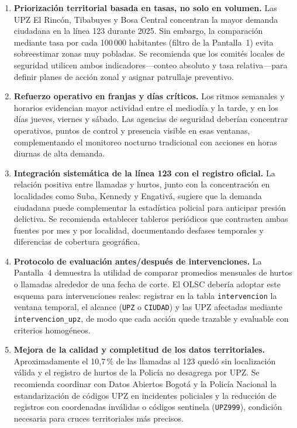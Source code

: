 \documentclass[12pt,letterpaper]{article}
\begin{document}
\begin{enumerate}
    \item \textbf{Priorización territorial basada en tasas, no solo en volumen.} Las UPZ El Rincón, Tibabuyes y Bosa Central concentran la mayor demanda ciudadana en la línea 123 durante 2025. Sin embargo, la comparación mediante tasa por cada 100\,000 habitantes (filtro de la Pantalla~1) evita sobreestimar zonas muy pobladas. Se recomienda que los comités locales de seguridad utilicen ambos indicadores---conteo absoluto y tasa relativa---para definir planes de acción zonal y asignar patrullaje preventivo.
    \item \textbf{Refuerzo operativo en franjas y días críticos.} Los ritmos semanales y horarios evidencian mayor actividad entre el mediodía y la tarde, y en los días jueves, viernes y sábado. Las agencias de seguridad deberían concentrar operativos, puntos de control y presencia visible en esas ventanas, complementando el monitoreo nocturno tradicional con acciones en horas diurnas de alta demanda.
    \item \textbf{Integración sistemática de la línea 123 con el registro oficial.} La relación positiva entre llamadas y hurtos, junto con la concentración en localidades como Suba, Kennedy y Engativá, sugiere que la demanda ciudadana puede complementar la estadística policial para anticipar presión delictiva. Se recomienda establecer tableros periódicos que contrasten ambas fuentes por mes y por localidad, documentando desfases temporales y diferencias de cobertura geográfica.
    \item \textbf{Protocolo de evaluación antes/después de intervenciones.} La Pantalla~4 demuestra la utilidad de comparar promedios mensuales de hurtos o llamadas alrededor de una fecha de corte. El OLSC debería adoptar este esquema para intervenciones reales: registrar en la tabla \texttt{intervencion} la ventana temporal, el alcance (\texttt{UPZ} o \texttt{CIUDAD}) y las UPZ afectadas mediante \texttt{intervencion\_upz}, de modo que cada acción quede trazable y evaluable con criterios homogéneos.
    \item \textbf{Mejora de la calidad y completitud de los datos territoriales.} Aproximadamente el 10,7\,\% de las llamadas al 123 quedó sin localización válida y el registro de hurtos de la Policía no desagrega por UPZ. Se recomienda coordinar con Datos Abiertos Bogotá y la Policía Nacional la estandarización de códigos UPZ en incidentes policiales y la reducción de registros con coordenadas inválidas o códigos sentinela (\texttt{UPZ999}), condición necesaria para cruces territoriales más precisos.

\end{enumerate}
\end{document}
